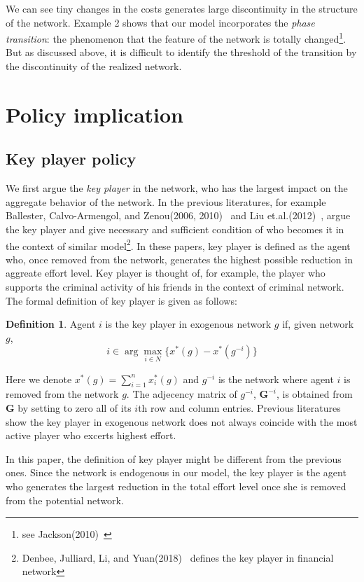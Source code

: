 \documentclass[12pt]{article}
\theoremstyle{definition}
\newtheorem{definition}{Definition}
\begin{document}
We can see tiny changes in the costs generates large discontinuity in the structure of the network.
Example 2 shows that our model incorporates the {\it{phase transition}}: the phenomenon that the feature of the network is totally changed\footnote{see Jackson(2010)~\cite{social}}.
But as discussed above, it is difficult to identify the threshold of the transition by the discontinuity of the realized network.


\section{Policy implication}

\subsection{Key player policy}

We first argue the {\it{key player}} in the network, who has the largest impact on the aggregate behavior of the network.
In the previous literatures, for example Ballester, Calvo-Armengol, and Zenou(2006, 2010)~\cite{whowho, delinquent} and Liu et.al.(2012)~\cite{criminal}, argue the key player and give necessary and sufficient condition of who becomes it in the context of similar model\footnote{Denbee, Julliard, Li, and Yuan(2018)~\cite{denbee} defines the key player in financial network}.
In these papers, key player is defined as the agent who, once removed from the network, generates the highest possible reduction in aggreate effort level.
Key player is thought of, for example, the player who supports the criminal activity of his friends in the context of criminal network.
The formal definition of key player is given as follows:

\begin{definition}
Agent $i$ is the key player in exogenous network $g$ if, given network $g$,
\[ i \in \arg \max_{i \in N} \{ x^*(g) - x^*(g^{-i}) \} \]
\end{definition}

Here we denote $x^*(g) = \sum_{i=1}^n x_i^*(g)$ and $g^{-i}$ is the network where agent $i$ is removed from the network $g$.
The adjecency matrix of $g^{-i}$, $\bm{G}^{-i}$, is obtained from $\bm{G}$ by setting to zero all of its $i$th row and column entries.
Previous literatures show the key player in exogenous network does not always coincide with the most active player who excerts highest effort.

In this paper, the definition of key player might be different from the previous ones.
Since the network is endogenous in our model, the key player is the agent who generates the largest reduction in the total effort level once she is removed from the potential network.
\end{document}
